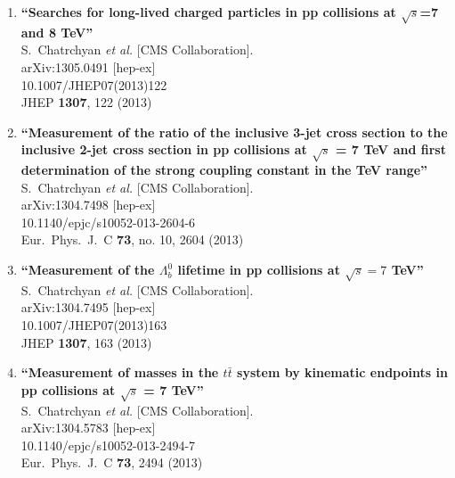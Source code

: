 \documentclass{article}
\begin{document}
\begin{enumerate}
\item%
{\bf ``Searches for long-lived charged particles in pp collisions at $\sqrt{s}$=7 and 8 TeV''}
  \\{}S.~Chatrchyan {\it et al.}  [CMS Collaboration].
  \\{}arXiv:1305.0491 [hep-ex]
    \\{}10.1007/JHEP07(2013)122
\\{}JHEP {\bf 1307}, 122 (2013) %


\item%
{\bf ``Measurement of the ratio of the inclusive 3-jet cross section to the inclusive 2-jet cross section in pp collisions at $\sqrt{s}$ = 7 TeV and first determination of the strong coupling constant in the TeV range''}
  \\{}S.~Chatrchyan {\it et al.}  [CMS Collaboration].
  \\{}arXiv:1304.7498 [hep-ex]
    \\{}10.1140/epjc/s10052-013-2604-6
\\{}Eur.\ Phys.\ J.\ C {\bf 73}, no. 10, 2604 (2013) %


\item%
{\bf ``Measurement of the $\Lambda_{b}^0$ lifetime in pp collisions at $\sqrt{s} = 7$ TeV''}
  \\{}S.~Chatrchyan {\it et al.}  [CMS Collaboration].
  \\{}arXiv:1304.7495 [hep-ex]
    \\{}10.1007/JHEP07(2013)163
\\{}JHEP {\bf 1307}, 163 (2013) %


\item%
{\bf ``Measurement of masses in the $t \bar{t}$ system by kinematic endpoints in pp collisions at $\sqrt{s}$ = 7 TeV''}
  \\{}S.~Chatrchyan {\it et al.}  [CMS Collaboration].
  \\{}arXiv:1304.5783 [hep-ex]
    \\{}10.1140/epjc/s10052-013-2494-7
\\{}Eur.\ Phys.\ J.\ C {\bf 73}, 2494 (2013) %



\end{enumerate}
\end{document}
